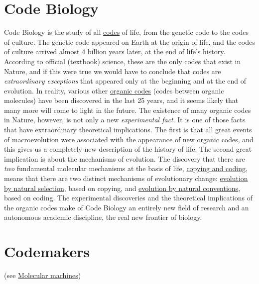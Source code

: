 \documentclass[12pt]{article}
\begin{document}
\section{Code Biology}
Code Biology is the study of all \hyperlink{code}{codes} of life, from the genetic code to the codes of culture. The genetic code appeared on Earth at the origin of life, and the codes of culture arrived almost 4 billion years later, at the end of life's history. According to official (textbook) science, these are the only codes that exist in Nature, and if this were true we would have to conclude that codes are \textit{extraordinary exceptions} that appeared only at the beginning and at the end of evolution. In reality, various other \hyperlink{organic_codes}{organic codes} (codes between organic molecules) have been discovered in the last 25 years, and it seems likely that many more will come to light in the future. The existence of many organic codes in Nature, however, is not only a new \textit{experimental fact}. It is one of those facts that have extraordinary theoretical implications. The first is that all great events of \hyperlink{macroevolution}{macroevolution} were associated with the appearance of new organic codes, and this gives us a completely new description of the history of life. The second great implication is about the mechanisms of evolution. The discovery that there are \textit{two} fundamental molecular mechanisms at the basis of life, \hyperlink{copying_and_coding}{copying and coding}, means that there are two distinct mechanisms of evolutionary change: \hyperlink{natural_selection}{evolution by natural selection}, based on copying, and \hyperlink{evolution_by_natural_conventions}{evolution by natural conventions}, based on coding. The experimental discoveries and the theoretical implications of the organic codes make of Code Biology an entirely new field of research and an autonomous academic discipline, the real new frontier of biology. 


\hypertarget{codemakers}{}
\section{Codemakers} (see \hyperlink{molecular_machines}{Molecular machines}) 


\hypertarget{codepoiesis}{}
\end{document}
